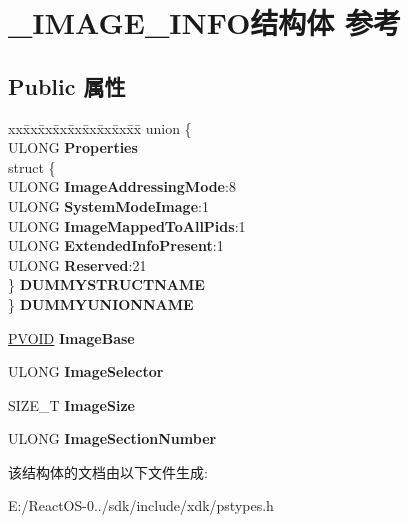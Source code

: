 \hypertarget{struct___i_m_a_g_e___i_n_f_o}{}\section{\+\_\+\+I\+M\+A\+G\+E\+\_\+\+I\+N\+F\+O结构体 参考}
\label{struct___i_m_a_g_e___i_n_f_o}
\subsection*{Public 属性}
\begin{DoxyCompactItemize}
\item 
\mbox{\label{struct___i_m_a_g_e___i_n_f_o_a1912bff6d96c8ac418d87d6f4024361a}} 
\begin{tabbing}
xx\=xx\=xx\=xx\=xx\=xx\=xx\=xx\=xx\=\kill
union \{\\
\>ULONG {\bfseries Properties}\\
\>struct \{\\
\>\>ULONG {\bfseries ImageAddressingMode}:8\\
\>\>ULONG {\bfseries SystemModeImage}:1\\
\>\>ULONG {\bfseries ImageMappedToAllPids}:1\\
\>\>ULONG {\bfseries ExtendedInfoPresent}:1\\
\>\>ULONG {\bfseries Reserved}:21\\
\>\} {\bfseries DUMMYSTRUCTNAME}\\
\} {\bfseries DUMMYUNIONNAME}\\

\end{tabbing}\item 
\mbox{\label{struct___i_m_a_g_e___i_n_f_o_a5d0c603892bf063d7f52a728eb6d0e2c}} 
\hyperlink{interfacevoid}{P\+V\+O\+ID} {\bfseries Image\+Base}
\item 
\mbox{\label{struct___i_m_a_g_e___i_n_f_o_ae66cd446bfd1b97c1d0f0efe04fd5ff6}} 
U\+L\+O\+NG {\bfseries Image\+Selector}
\item 
\mbox{\label{struct___i_m_a_g_e___i_n_f_o_a10bfd73780441602e28ee9ac06ba6d7b}} 
S\+I\+Z\+E\+\_\+T {\bfseries Image\+Size}
\item 
\mbox{\label{struct___i_m_a_g_e___i_n_f_o_a3c956abde50853b660eae6bfaee048d7}} 
U\+L\+O\+NG {\bfseries Image\+Section\+Number}
\end{DoxyCompactItemize}


该结构体的文档由以下文件生成\+:\begin{DoxyCompactItemize}
\item 
E\+:/\+React\+O\+S-\/0../sdk/include/xdk/pstypes.\+h\end{DoxyCompactItemize}
